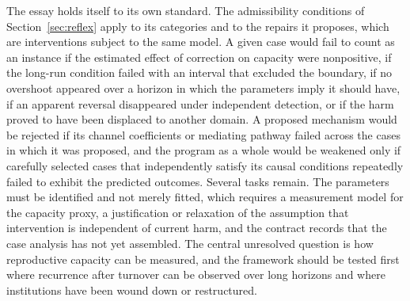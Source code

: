 \documentclass[12pt]{article}
\theoremstyle{remark}
\begin{document}
The essay holds itself to its own standard. The admissibility conditions of Section~\ref{sec:reflex} apply to its categories and to the repairs it proposes, which are interventions subject to the same model. A given case would fail to count as an instance if the estimated effect of correction on capacity were nonpositive, if the long-run condition failed with an interval that excluded the boundary, if no overshoot appeared over a horizon in which the parameters imply it should have, if an apparent reversal disappeared under independent detection, or if the harm proved to have been displaced to another domain. A proposed mechanism would be rejected if its channel coefficients or mediating pathway failed across the cases in which it was proposed, and the program as a whole would be weakened only if carefully selected cases that independently satisfy its causal conditions repeatedly failed to exhibit the predicted outcomes. Several tasks remain. The parameters must be identified and not merely fitted, which requires a measurement model for the capacity proxy, a justification or relaxation of the assumption that intervention is independent of current harm, and the contract records that the case analysis has not yet assembled. The central unresolved question is how reproductive capacity can be measured, and the framework should be tested first where recurrence after turnover can be observed over long horizons and where institutions have been wound down or restructured.
\end{document}
